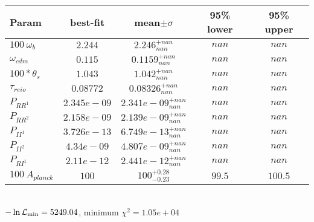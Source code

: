 \begin{tabular}{|l|c|c|c|c|} 
 \hline 
Param & best-fit & mean$\pm\sigma$ & 95\% lower & 95\% upper \\ \hline 
$100~\omega_{b }$ &$2.244$ & $2.246_{nan}^{+nan}$ & $nan$ & $nan$ \\ 
$\omega_{cdm }$ &$0.115$ & $0.1159_{nan}^{+nan}$ & $nan$ & $nan$ \\ 
$100*\theta_{s }$ &$1.043$ & $1.042_{nan}^{+nan}$ & $nan$ & $nan$ \\ 
$\tau_{reio }$ &$0.08772$ & $0.08326_{nan}^{+nan}$ & $nan$ & $nan$ \\ 
$P_{{RR}^1 }$ &$2.345e-09$ & $2.341e-09_{nan}^{+nan}$ & $nan$ & $nan$ \\ 
$P_{{RR}^2 }$ &$2.158e-09$ & $2.139e-09_{nan}^{+nan}$ & $nan$ & $nan$ \\ 
$P_{{II}^1 }$ &$3.726e-13$ & $6.749e-13_{nan}^{+nan}$ & $nan$ & $nan$ \\ 
$P_{{II}^2 }$ &$4.34e-09$ & $4.807e-09_{nan}^{+nan}$ & $nan$ & $nan$ \\ 
$P_{{RI}^1 }$ &$2.11e-12$ & $2.441e-12_{nan}^{+nan}$ & $nan$ & $nan$ \\ 
$100~A_{planck }$ &$100$ & $100_{-0.23}^{+0.28}$ & $99.5$ & $100.5$ \\ 
\hline 
 \end{tabular} \\ 
$-\ln{\cal L}_\mathrm{min} =5249.04$, minimum $\chi^2=1.05e+04$ \\ 
